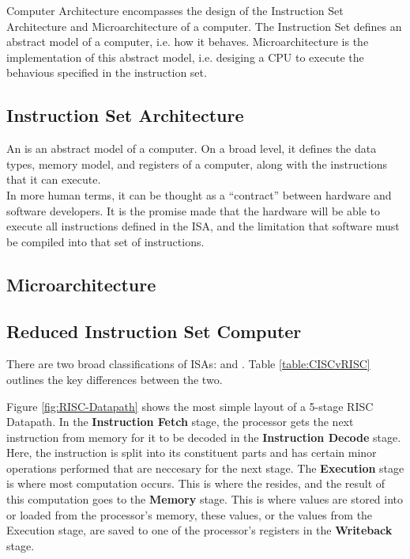 
Computer Architecture encompasses the design of the Instruction Set Architecture and Microarchitecture of a computer. The Instruction Set defines an abstract model of a computer, i.e. how it behaves. Microarchitecture is the implementation of this abstract model, i.e. desiging a CPU to execute the behavious specified in the instruction set.



\subsection{Instruction Set Architecture}
    An  is an abstract model of a computer. On a broad level, it defines the data types, memory model, and registers of a computer, along with the instructions that it can execute. \\
    In more human terms, it can be thought as a ``contract'' between hardware and software developers. It is the promise made that the hardware will be able to execute all instructions defined in the \gls{ISA}, and the limitation that software must be compiled into that set of instructions.

    

\subsection{Microarchitecture}
    
\subsection{Reduced Instruction Set Computer}
    There are two broad classifications of \glspl{ISA}:  and . Table \ref{table:CISCvRISC} outlines the key differences between the two.

    

    Figure \ref{fig:RISC-Datapath} shows the most simple layout of a 5-stage RISC Datapath. In the \textbf{Instruction Fetch} stage, the processor gets the next instruction from memory for it to be decoded in the \textbf{Instruction Decode} stage. Here, the instruction is split into its constituent parts and has certain minor operations performed that are neccesary for the next stage. The \textbf{Execution} stage is where most computation occurs. This is where the  resides, and the result of this computation goes to the \textbf{Memory} stage. This is where values are stored into or loaded from the processor's memory, these values, or the values from the Execution stage, are saved to one of the processor's registers in the \textbf{Writeback} stage. 
    

